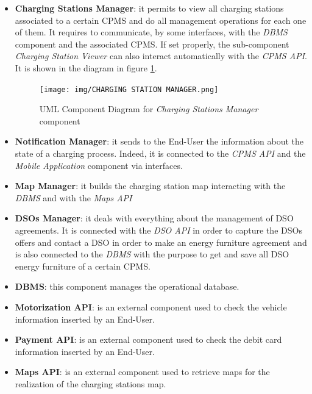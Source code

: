 \documentclass[a4paper]{report}
\begin{document}
\begin{itemize}
\item \textbf{Charging Stations Manager}: it permits to view all charging stations associated to a certain CPMS and do all management operations for each one of them. It requires to communicate, by some interfaces, with the \textit{DBMS} component and the associated CPMS. If set properly, the sub-component \textit{Charging Station Viewer} can also interact automatically with the \textit{CPMS API}. It is shown in the diagram in figure \ref{fig:chargingstationsmgr-component}.


\begin{figure}[htp]
\centering
\texttt{[image: img/CHARGING STATION MANAGER.png]}
\caption{UML Component Diagram for \textit{Charging Stations Manager} component}
\label{fig:chargingstationsmgr-component}
\end{figure}

\item \textbf{Notification Manager}: it sends to the End-User the information about the state of a charging process. Indeed, it is connected to the \textit{CPMS API} and the \textit{Mobile Application} component via interfaces.

\item \textbf{Map Manager}: it builds the charging station map interacting with the \textit{DBMS} and with the \textit{Maps API}

\item \textbf{DSOs Manager}: it deals with everything about the management of DSO agreements. It is connected with the \textit{DSO API} in order to capture the DSOs offers and contact a DSO in order to make an energy furniture agreement and is also connected to the \textit{DBMS} with the purpose to get and save all DSO energy furniture of a certain CPMS.

\item \textbf{DBMS}: this component manages the operational database.

\item \textbf{Motorization API}: is an external component used to check the vehicle information inserted by an End-User.

\item \textbf{Payment API}: is an external component used to check the debit card information inserted by an End-User.

\item \textbf{Maps API}: is an external component used to retrieve maps for the realization of the charging stations map.


\end{itemize}
\end{document}
